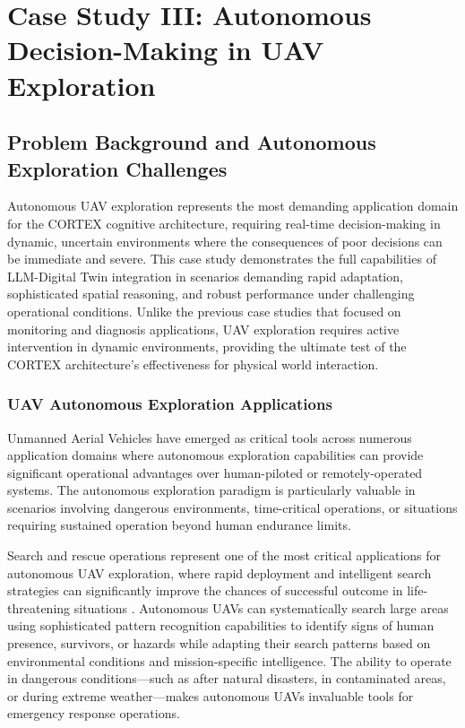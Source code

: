 
\chapter{Case Study III: Autonomous Decision-Making in UAV Exploration} \label{chp:uav}


\section{Problem Background and Autonomous Exploration Challenges}

Autonomous UAV exploration represents the most demanding application domain for the CORTEX cognitive architecture, requiring real-time decision-making in dynamic, uncertain environments where the consequences of poor decisions can be immediate and severe. This case study demonstrates the full capabilities of LLM-Digital Twin integration in scenarios demanding rapid adaptation, sophisticated spatial reasoning, and robust performance under challenging operational conditions. Unlike the previous case studies that focused on monitoring and diagnosis applications, UAV exploration requires active intervention in dynamic environments, providing the ultimate test of the CORTEX architecture's effectiveness for physical world interaction.

\subsection{UAV Autonomous Exploration Applications}

Unmanned Aerial Vehicles have emerged as critical tools across numerous application domains where autonomous exploration capabilities can provide significant operational advantages over human-piloted or remotely-operated systems. The autonomous exploration paradigm is particularly valuable in scenarios involving dangerous environments, time-critical operations, or situations requiring sustained operation beyond human endurance limits.

Search and rescue operations represent one of the most critical applications for autonomous UAV exploration, where rapid deployment and intelligent search strategies can significantly improve the chances of successful outcome in life-threatening situations \cite{goodrich2008supporting}. Autonomous UAVs can systematically search large areas using sophisticated pattern recognition capabilities to identify signs of human presence, survivors, or hazards while adapting their search patterns based on environmental conditions and mission-specific intelligence. The ability to operate in dangerous conditions—such as after natural disasters, in contaminated areas, or during extreme weather—makes autonomous UAVs invaluable tools for emergency response operations.

